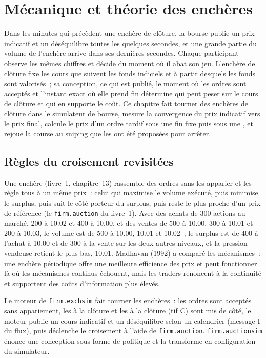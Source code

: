 \chapter{Mécanique et théorie des enchères}\label{ch:mx:auction-mechanics-and-theory}

Dans les minutes qui précèdent une enchère de clôture, la bourse publie un prix indicatif et un déséquilibre toutes les quelques secondes, et une grande partie du volume
de l'enchère arrive dans ses dernières secondes. Chaque participant observe les mêmes chiffres et décide du moment où il abat son jeu. L'enchère de clôture fixe les
cours que suivent les fonds indiciels et à partir desquels les fonds sont valorisés~; sa conception, ce qui est publié, le moment où les ordres sont acceptés et l'instant exact où elle prend fin détermine qui
peut peser sur le cours de clôture et qui en supporte le coût. Ce chapitre fait tourner des enchères de clôture dans le simulateur de bourse, mesure la convergence du prix indicatif vers le
prix final, calcule le prix d'un ordre tardif sous une fin fixe puis sous une , et rejoue la course au sniping que les  ont été proposées pour arrêter.

\section{Règles du croisement revisitées}

Une enchère (livre~1, chapitre~13) rassemble des ordres sans les apparier et les règle tous à un même prix~: celui qui maximise le
volume exécuté, puis minimise le surplus, puis suit le côté porteur du surplus, puis reste le plus proche d'un prix de référence (le
\texttt{firm.auction} du livre~1). Avec des achats de 300 actions au marché, 200 à 10.02 et 400 à 10.00, et des ventes de 500 à 10.00, 300 à 10.01 et 200 à 10.03, le volume
est de 500 à 10.00, 10.01 et 10.02~; le surplus est de 400 à l'achat à 10.00 et de 300 à la vente sur les deux autres niveaux, et la pression vendeuse retient le plus bas, 10.01.
Madhavan (1992) a comparé les mécanismes~: une enchère périodique offre une meilleure efficience des prix et peut fonctionner là où les mécanismes continus échouent, mais les traders
renoncent à la continuité et supportent des coûts d'information plus élevés.

Le moteur de \texttt{firm.exchsim} fait tourner les enchères~: les ordres sont acceptés sans appariement, les  à la clôture et les  à la clôture (tif C) sont mis de côté, le
moteur publie un cours indicatif et un déséquilibre selon un calendrier (message I du flux), puis déclenche le croisement à l'aide de \texttt{firm.auction}. \texttt{firm.auctionsim}
énonce une conception sous forme de politique et la transforme en configuration du simulateur.

